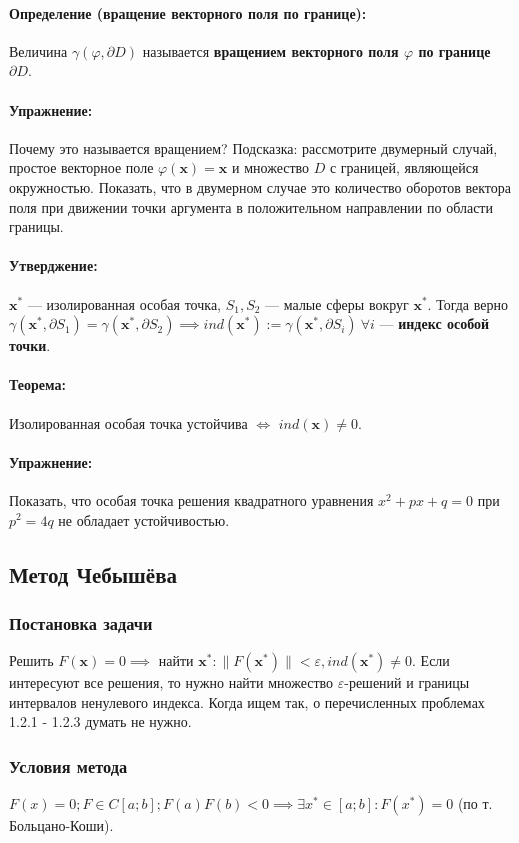\paragraph{Определение (вращение векторного поля по границе):} Величина $\gamma(\varphi, \partial D)$ называется \textbf{вращением векторного поля $\varphi$ по границе $\partial D$}.
\paragraph{Упражнение:} Почему это называется вращением? Подсказка: рассмотрите двумерный случай, простое векторное поле $\varphi(\mathbf{x}) = \mathbf{x}$ и множество $D$ с границей, являющейся окружностью. Показать, что в двумерном случае это количество оборотов вектора поля при движении точки аргумента в положительном направлении по области границы.
\paragraph{Утверджение:} $\mathbf{x^*}$ --- изолированная особая точка, $S_1, S_2$ --- малые сферы вокруг $\mathbf{x^*}$. Тогда верно $\gamma(\mathbf{x^*}, \partial S_1) = \gamma(\mathbf{x^*}, \partial S_2) \implies ind(\mathbf{x^*}) := \gamma(\mathbf{x^*}, \partial S_i) \ \forall i$ --- \textbf{индекс особой точки}.
\paragraph{Теорема:} Изолированная особая точка устойчива $\iff$ $ind(\mathbf{x}) \neq 0$.
\paragraph{Упражнение:} Показать, что особая точка решения квадратного уравнения $x^2+px+q=0$ при $p^2=4q$ не обладает устойчивостью.
\subsection{Метод Чебышёва}
\subsubsection{Постановка задачи}
Решить $F(\mathbf{x}) = 0 \implies$ найти $\mathbf{x^*}: \|F(\mathbf{x^*})\|<\varepsilon, ind(\mathbf{x^*}) \neq 0$.
Если интересуют все решения, то нужно найти множество $\varepsilon$-решений и границы интервалов ненулевого индекса.
Когда ищем так, о перечисленных проблемах 1.2.1 - 1.2.3 думать не нужно.
\subsubsection{Условия метода}
$F(x)=0; F \in C[a; b]; F(a)F(b) < 0 \implies \exists x^* \in [a; b]: F(x^*)=0$ (по т. Больцано-Коши).

